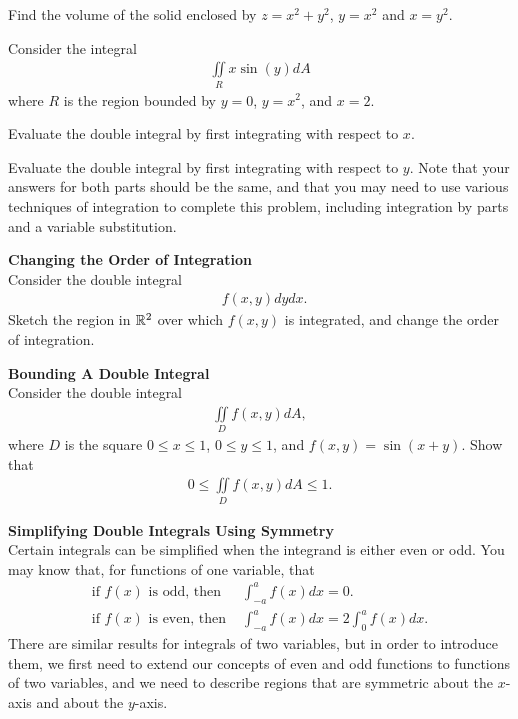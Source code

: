 \item %
Find the volume of the solid enclosed by $z = x^2 + y^2$, $y = x^2$ and $x=y^2$.
\item %
Consider the integral
\begin{align*}
  \iint\limits_R x\sin(y) dA
\end{align*}
 where $R$ is the region bounded by $y=0$, $y=x^2$, and $x=2$.
\BEN
\item Evaluate the double integral by first integrating with respect to $x$. 
\item Evaluate the double integral by first integrating with respect to $y$. 
\EEN
Note that your answers for both parts should be the same, and that you may need to use various techniques of integration to complete this problem, including integration by parts and a variable substitution. 
\item %
\textbf{Changing the Order of Integration} \\
Consider the double integral
\begin{align*}
  \mathop{\int_{0}^{1+e} \! \int_0^{\ln(x-1)}} f(x,y) dydx .
\end{align*}
Sketch the region in $\mathbb{R}^2$ over which $f(x,y)$ is integrated, and change the order of integration.  
\item %
\textbf{Bounding A Double Integral} \\
Consider the double integral
\begin{align*}
  \iint\limits_D f(x,y) dA,
\end{align*}
where $D$ is the square $0\le x \le 1$, $0\le y \le 1$, and $f(x,y) = \sin(x+y)$. Show that 
\begin{align*}
  0 \le \iint\limits_D f(x,y) dA \le 1.
\end{align*}
\item %
\textbf{Simplifying Double Integrals Using Symmetry} \\
Certain integrals can be simplified when the integrand is either even or odd. You may know that, for functions of one variable, that
\begin{align*}
  \text{if }f(x)\text{ is odd, then } & \int_{-a}^{a} f(x) dx = 0 . \\
  \text{if }f(x)\text{ is even, then } & \int_{-a}^{a} f(x) dx = 2 \int_0^a f(x) dx.
\end{align*}
There are similar results for integrals of two variables, but in order to introduce them, we first need to extend our concepts of even and odd functions to functions of two variables, and we need to describe regions that are symmetric about the $x$-axis and about the $y$-axis. 

